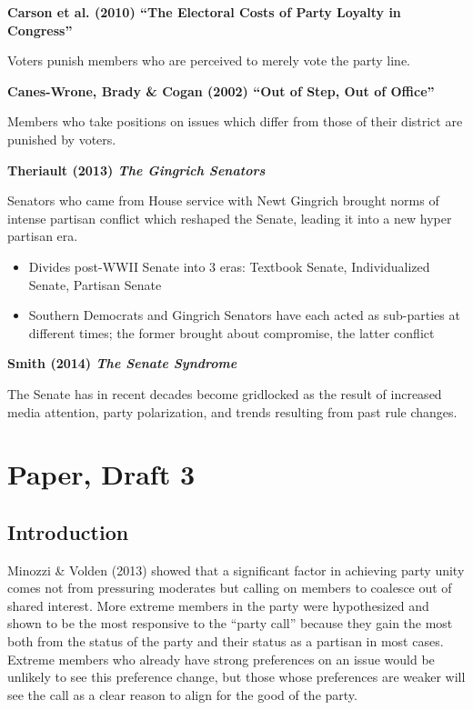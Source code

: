 \documentclass[12pt]{article}
\begin{document}
\noindent
\textbf{Carson et al. (2010) ``The Electoral Costs of Party Loyalty in Congress''}

Voters punish members who are perceived to merely vote the party line.

\noindent
\textbf{Canes-Wrone, Brady \& Cogan (2002) ``Out of Step, Out of Office''}

Members who take positions on issues which differ from those of their district are punished by voters.

\noindent
\textbf{Theriault (2013) \textit{The Gingrich Senators}}

Senators who came from House service with Newt Gingrich brought norms of intense partisan conflict which reshaped the Senate, leading it into a new hyper partisan era.

\begin{itemize}
	\item Divides post-WWII Senate into 3 eras: Textbook Senate, Individualized Senate, Partisan Senate
		
	\item Southern Democrats and Gingrich Senators have each acted as sub-parties at different times; the former brought about compromise, the latter conflict
\end{itemize}

\noindent
\textbf{Smith (2014) \textit{The Senate Syndrome}}

The Senate has in recent decades become gridlocked as the result of increased media attention, party polarization, and trends resulting from past rule changes. 



\pagebreak



\section{Paper, Draft 3}

\subsection{Introduction}

Minozzi \& Volden (2013) showed that a significant factor in achieving party unity comes not from pressuring moderates but calling on members to coalesce out of shared interest. More extreme members in the party were hypothesized and shown to be the most responsive to the ``party call'' because they gain the most both from the status of the party and their status as a partisan in most cases. Extreme members who already have strong preferences on an issue would be unlikely to see this preference change, but those whose preferences are weaker will see the call as a clear reason to align for the good of the party.
\end{document}
